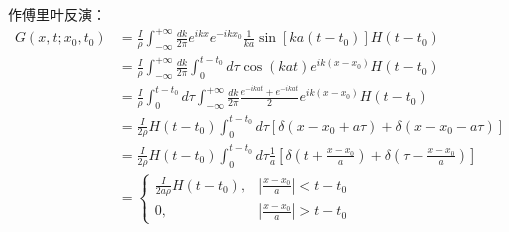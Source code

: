 \begin{ex}[无穷长弦横振动]
    作傅里叶反演：
    $$\begin{aligned}
    G(x,t;x_{0},t_{0})&=\frac{I}{\rho}\int_{-\infty}^{+\infty}\frac{dk}{2\pi}e^{ikx}e^{-ikx_{0}}\frac{1}{ka}\sin[ka(t-t_{0})]H(t-t_{0})\\
    &=\frac{I}{\rho}\int_{-\infty}^{+\infty}\frac{dk}{2\pi}\int_{0}^{t-t_{0}}d\tau\cos(kat)e^{ik(x-x_{0})}H(t-t_{0})\\
    &=\frac{I}{\rho}\int_{0}^{t-t_{0}}d\tau\int_{-\infty}^{+\infty}\frac{dk}{2\pi}\frac{e^{-ikat}+e^{-ikat}}{2}e^{ik(x-x_{0})}H(t-t_{0})\\
    &=\frac{I}{2\rho}H(t-t_{0})\int_{0}^{t-t_{0}}d\tau[\delta(x-x_{0}+a\tau)+\delta(x-x_{0}-a\tau)]\\
    &=\frac{I}{2\rho}H(t-t_{0})\int_{0}^{t-t_{0}}d\tau\frac{1}{a}[\delta(t+\frac{x-x_{0}}{a})+\delta(\tau-\frac{x-x_{0}}{a})]\\
    &=\begin{cases}
        \frac{I}{2a\rho}H(t-t_{0}),&|\frac{x-x_{0}}{a}|<t-t_{0}\\
        0,&|\frac{x-x_{0}}{a}|>t-t_{0}
    \end{cases}
\end{aligned}$$
\end{ex}
    